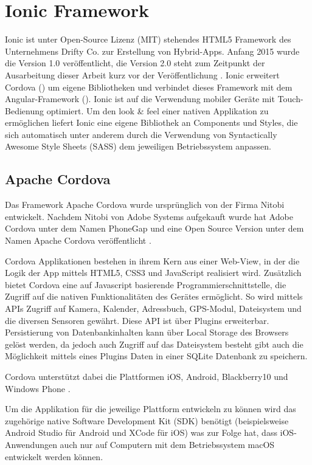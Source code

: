 \chapter{Ionic Framework}
\label{cha:ionic}
%
Ionic ist unter Open-Source Lizenz (MIT) stehendes HTML5 Framework des Unternehmens Drifty Co. zur Erstellung von Hybrid-Apps. Anfang 2015 wurde die Version 1.0 veröffentlicht, die Version 2.0 steht zum Zeitpunkt der Ausarbeitung dieser Arbeit kurz vor der Veröffentlichung \cite{ionic2Anounce}.
Ionic erweitert Cordova () um eigene Bibliotheken und verbindet dieses Framework mit dem Angular-Framework (). Ionic ist auf die Verwendung mobiler Geräte mit Touch-Bedienung optimiert. Um den look \& feel einer nativen Applikation zu ermöglichen liefert Ionic eine eigene Bibliothek an Components und Styles, die sich automatisch unter anderem  durch die Verwendung von Syntactically Awesome Style Sheets (SASS) dem jeweiligen Betriebssystem anpassen.
%
%
\section{Apache Cordova}
\label{sec:ApacheCordova}
%
Das Framework Apache Cordova wurde ursprünglich von der Firma Nitobi entwickelt. Nachdem Nitobi von Adobe Systems aufgekauft wurde hat Adobe Cordova unter dem Namen PhoneGap und eine Open Source Version unter dem Namen Apache Cordova veröffentlicht \cite{adobePhoneGap}.

Cordova Applikationen bestehen in ihrem Kern aus einer Web-View, in der die Logik der App mittels HTML5, CSS3 und JavaScript realisiert wird. 
Zusätzlich bietet Cordova eine auf Javascript basierende Programmierschnittstelle, die Zugriff auf die nativen Funktionalitäten des Gerätes ermöglicht. So wird mittels APIs Zugriff auf Kamera, Kalender, Adressbuch, GPS-Modul, Dateisystem und die diversen Sensoren gewährt. Diese API ist über Plugins erweiterbar. Persistierung von Datenbankinhalten kann über Local Storage des Browsers gelöst werden, da jedoch auch Zugriff auf das Dateisystem besteht gibt auch die Möglichkeit mittels eines Plugins Daten in einer SQLite Datenbank zu speichern.

Cordova unterstützt dabei die Plattformen iOS, Android, Blackberry10 und Windows Phone \cite{cordovaSupportedPlatforms}.

Um die Applikation für die jeweilige Plattform entwickeln zu können wird das zugehörige native Software Development Kit (SDK) benötigt (beispielsweise Android Studio für Android und XCode für iOS) was zur Folge hat, dass iOS-Anwendungen auch nur auf Computern mit dem Betriebssystem macOS entwickelt werden können.

